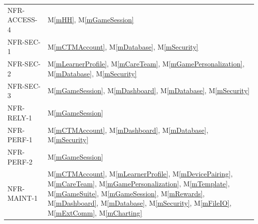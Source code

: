 \documentclass[12pt, titlepage]{article}
\newcommand{\mref}[1]{M\ref{#1}}
\begin{document}
\begin{longtable}{p{} p{}}
NFR-ACCESS-4 & \mref{mHH}, \mref{mGameSession}\\
NFR-SEC-1 & \mref{mCTMAccount}, \mref{mDatabase}, \mref{mSecurity}\\
NFR-SEC-2 & \mref{mLearnerProfile}, \mref{mCareTeam}, \mref{mGamePersonalization}, \mref{mDatabase}, \mref{mSecurity}\\
NFR-SEC-3 & \mref{mGameSession}, \mref{mDashboard}, \mref{mDatabase}, \mref{mSecurity}\\
NFR-RELY-1 & \mref{mGameSession}\\
NFR-PERF-1 & \mref{mCTMAccount}, \mref{mDashboard}, \mref{mDatabase}, \mref{mSecurity}\\
NFR-PERF-2 & \mref{mGameSession}\\
NFR-MAINT-1 & \mref{mCTMAccount}, \mref{mLearnerProfile}, \mref{mDevicePairing}, \mref{mCareTeam}, \mref{mGamePersonalization}, \mref{mTemplate}, \mref{mGameSuite}, \mref{mGameSession}, \mref{mRewards}, \mref{mDashboard}, \mref{mDatabase}, \mref{mSecurity}, \mref{mFileIO}, \mref{mExtComm}, \mref{mCharting}\\
\bottomrule
\end{longtable}
\end{document}
